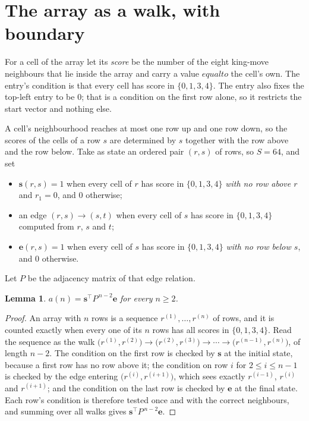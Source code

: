\documentclass[11pt,a4paper]{article}
\theoremstyle{plain}
\newtheorem{lemma}[theorem]{Lemma}
\theoremstyle{definition}
\begin{document}
\section{The array as a walk, with boundary}

For a cell of the array let its \emph{score} be the number of the eight king-move neighbours that lie inside
the array and carry a value $equal to$ the cell's own. The entry's condition is that every cell
has score in $\{0,1,3,4\}$. The entry also fixes the top-left entry to be $0$; that is a condition on the first row alone, so it restricts the start vector and nothing else.

A cell's neighbourhood reaches at most one row up and one row down, so the scores of the
cells of a row $s$ are determined by $s$ together with the row above and the row below.
Take as state an ordered pair $(r,s)$ of rows, so $S=64$, and set
\begin{itemize}
\item $\mathbf{s}(r,s)=1$ when every cell of $r$ has score in $\{0,1,3,4\}$ \emph{with no row
above $r$} and $r_1=0$, and $0$ otherwise;
\item an edge $(r,s)\to(s,t)$ when every cell of $s$ has score in $\{0,1,3,4\}$ computed from
$r$, $s$ and $t$;
\item $\mathbf{e}(r,s)=1$ when every cell of $s$ has score in $\{0,1,3,4\}$ \emph{with no row
below $s$}, and $0$ otherwise.
\end{itemize}
Let $P$ be the adjacency matrix of that edge relation.

\begin{lemma}\label{lem:walk}
$a(n)=\mathbf{s}^{\!\top}P^{\,n-2}\mathbf{e}$ for every $n\ge2$.
\end{lemma}

\begin{proof}
An array with $n$ rows is a sequence $r^{(1)},\dots,r^{(n)}$ of rows, and it is counted
exactly when every one of its $n$ rows has all scores in $\{0,1,3,4\}$. Read the sequence as the
walk $\bigl(r^{(1)},r^{(2)}\bigr)\to\bigl(r^{(2)},r^{(3)}\bigr)\to\cdots\to
\bigl(r^{(n-1)},r^{(n)}\bigr)$, of length $n-2$. The condition on the first row is
checked by $\mathbf{s}$ at the initial state, because a first row has no row above it; the
condition on row $i$ for $2\le i\le n-1$ is checked by the edge entering
$\bigl(r^{(i)},r^{(i+1)}\bigr)$, which sees exactly $r^{(i-1)}$, $r^{(i)}$ and
$r^{(i+1)}$; and the condition on the last row is checked by $\mathbf{e}$ at the final
state. Each row's condition is therefore tested once and with the correct neighbours, and
summing over all walks gives $\mathbf{s}^{\!\top}P^{\,n-2}\mathbf{e}$.
\end{proof}
\end{document}
